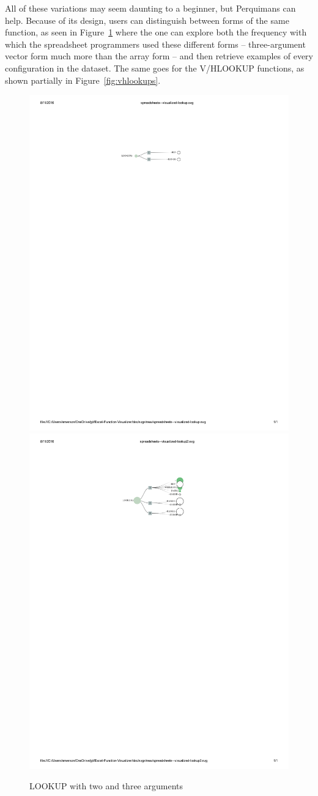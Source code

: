 \documentclass[conference]{IEEEtran}
\newcommand{\toolname}{Perquimans } \newcommand{\toolnameend}{Perquimans}
\begin{document}
	All of these variations may seem daunting to a beginner, but \toolname can
	help. Because of its design, users can distinguish between forms of the same
	function, as seen in Figure~\ref{fig:lookups} where the one can explore both
	the frequency with which the spreadsheet programmers used these different forms
	-- three-argument vector form much more than the array form -- and then
	retrieve examples of every configuration in the dataset. The same goes for the
	V/HLOOKUP functions, as shown partially in Figure~\ref{fig:vhlookups}.
	
	\begin{figure}[h] \centering \includegraphics[width=.5\textwidth]{lookup-2}
		\includegraphics[width=.5\textwidth]{lookup-3} \caption{LOOKUP with two and
			three arguments}  \label{fig:lookups} \end{figure}
	
\end{document}
